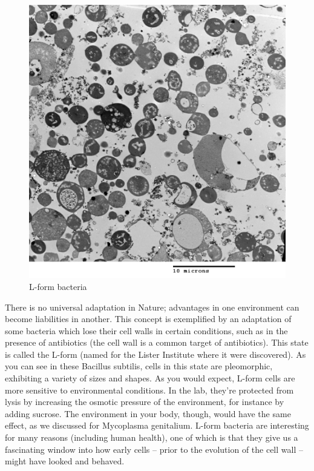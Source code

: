 \documentclass[]{tufte-book}
\begin{document}
\begin{figure}
\includegraphics{img/02_schematic/2_2_1_L_form_bacteria} \caption[L-form bacteria]{L-form bacteria}\label{fig:2-2-1}
\end{figure}

There is no universal adaptation in Nature; advantages in one environment can become liabilities in another. This concept is exemplified by an adaptation of some bacteria which lose their cell walls in certain conditions, such as in the presence of antibiotics (the cell wall is a common target of antibiotics). This state is called the L-form (named for the Lister Institute where it were discovered). As you can see in these Bacillus subtilis, cells in this state are pleomorphic, exhibiting a variety of sizes and shapes. As you would expect, L-form cells are more sensitive to environmental conditions. In the lab, they're protected from lysis by increasing the osmotic pressure of the environment, for instance by adding sucrose. The environment in your body, though, would have the same effect, as we discussed for Mycoplasma genitalium. L-form bacteria are interesting for many reasons (including human health), one of which is that they give us a fascinating window into how early cells -- prior to the evolution of the cell wall -- might have looked and behaved.
\end{document}
